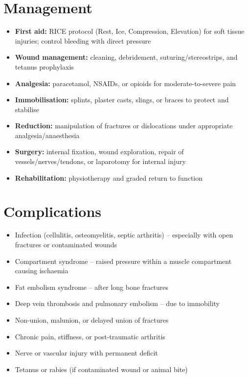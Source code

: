 \section*{Management}
\begin{itemize}
    \item \textbf{First aid:} RICE protocol (Rest, Ice, Compression, Elevation) for soft tissue injuries; control bleeding with direct pressure
    \item \textbf{Wound management:} cleaning, debridement, suturing/stereostrips, and tetanus prophylaxis
    \item \textbf{Analgesia:} paracetamol, NSAIDs, or opioids for moderate-to-severe pain
    \item \textbf{Immobilisation:} splints, plaster casts, slings, or braces to protect and stabilise
    \item \textbf{Reduction:} manipulation of fractures or dislocations under appropriate analgesia/anaesthesia
    \item \textbf{Surgery:} internal fixation, wound exploration, repair of vessels/nerves/tendons, or laparotomy for internal injury
    \item \textbf{Rehabilitation:} physiotherapy and graded return to function
\end{itemize}

\section*{Complications}
\begin{itemize}
    \item Infection (cellulitis, osteomyelitis, septic arthritis) -- especially with open fractures or contaminated wounds
    \item Compartment syndrome -- raised pressure within a muscle compartment causing ischaemia
    \item Fat embolism syndrome -- after long bone fractures
    \item Deep vein thrombosis and pulmonary embolism -- due to immobility
    \item Non-union, malunion, or delayed union of fractures
    \item Chronic pain, stiffness, or post-traumatic arthritis
    \item Nerve or vascular injury with permanent deficit
    \item Tetanus or rabies (if contaminated wound or animal bite)
\end{itemize}

